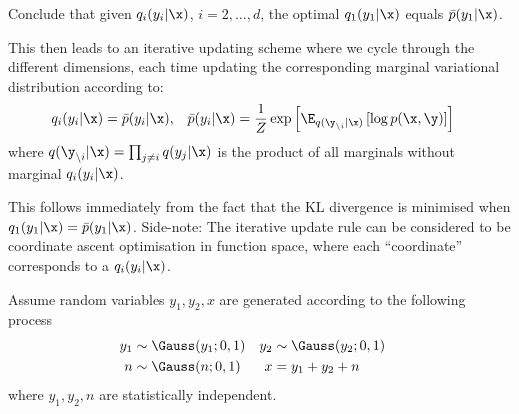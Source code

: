 \begin{exenumerate}
\begin{solution}
  \end{solution}

\item Conclude that given $q_i(y_i|\x)$, $i=2, \ldots, d$, the optimal $q_1(y_1|\x)$ equals $\bar{p}(y_1|\x)$.

  This then leads to an iterative updating scheme where we cycle
  through the different dimensions, each time updating the corresponding marginal variational distribution according to:
  \begin{align}
    q_i(y_i|\x) &=  \bar{p}(y_i|\x), &  \bar{p}(y_i|\x) &= \frac{1}{Z} \exp\left[ \E_{q(\y_{\setminus i}|\x)}\left[ \log p(\x,\y)\right] \right]
  \end{align}
  where $q(\y_{\setminus i}|\x) = \prod_{j \neq i} q(y_j | \x)$ is the product of all marginals without marginal $q_i(y_i|\x)$.

  \begin{solution}
    This follows immediately from the fact that the KL divergence is
    minimised when $q_1(y_1|\x) = \bar{p}(y_1|\x)$. Side-note: The
    iterative update rule can be considered to be coordinate ascent
    optimisation in function space, where each ``coordinate''
    corresponds to a $q_i(y_i|\x)$.
    
  \end{solution}
\end{exenumerate}


Assume random variables $y_1, y_2, x$ are generated according to the following process
\begin{align}
  y_1 &\sim \Gauss(y_1; 0, 1) &   y_2 &\sim \Gauss(y_2; 0, 1) \\
  n &\sim \Gauss(n; 0, 1)    &    x & = y_1+y_2+n & 
\end{align}
where $y_1, y_2, n$ are statistically independent.

